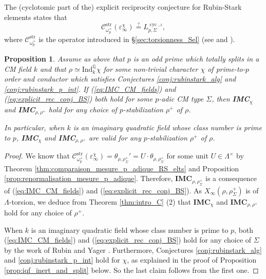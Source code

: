 \documentclass[12pt]{amsart}
\newcommand\bQ{\mathbb{Q}}
\newcommand\sC{\mathscr{C}}
\newcommand{\str}{\mathrm{str}}
\newcommand{\Ind}{\mathrm{Ind}}
\DeclareMathOperator{\cyc}{cyc}
\theoremstyle{defstyle}
\theoremstyle{thmstyle}
\newtheorem{proposition}[subsubsection]{Proposition}
\begin{document}
The (cyclotomic part of the) explicit reciprocity conjecture for Rubin-Stark elements states that 
\begin{equation}\label{eq:explicit_rec_conj_BS}
\sC_{\omega_p^+}^\str(\varepsilon_\infty^\chi)\overset{?}{=}L^{\cyc,\iota}_{p,\Sigma},
\end{equation}
where $\sC_{\omega_p^+}^\str$ is the operator introduced in \S\ref{sec:torsionness_Sel} (see \cite[Conjecture 2]{buyukbodukmainconjecture} and \cite[Conjecture 4.8 and (21)]{buyukboduksakamoto}).
\begin{proposition}\label{prop:IMC_Katz}
	Assume as above that $p$ is an odd prime which totally splits in a CM field $k$ and that $\rho\simeq \Ind_k^\bQ \chi$ for some non-trivial character $\chi$ of prime-to-$p$ order and conductor which satisfies Conjectures \ref{conj:rubinstark_alg} and \ref{conj:rubinstark_p_int}. If (\ref{eq:IMC_CM_fields}) and (\ref{eq:explicit_rec_conj_BS}) both hold for some $p$-adic CM type $\Sigma$, then \textbf{IMC}$_{\chi}$ and \textbf{IMC}$_{\rho,\rho^+}$ hold for any choice of $p$-stabilization $\rho^+$ of $\rho$. 
	
	In particular, when $k$ is an imaginary quadratic field whose class number is prime to $p$, \textbf{IMC}$_\chi$ and \textbf{IMC}$_{\rho,\rho^+}$ are valid for any $p$-stabilization $\rho^+$ of $\rho$. 
	\end{proposition}
\begin{proof}
 We know that $\sC_{\omega_p^+}^\str(\varepsilon_\infty^\chi)=\theta_{\rho,\rho_\Sigma^+}'=U\cdot \theta_{\rho,\rho_\Sigma^+}$ for some unit $U\in\Lambda^\times$ by Theorem \ref{thm:comparaison_mesure_p_adique_RS_elts} and Proposition \ref{prop:renormalisation_mesure_p_adique}. Therefore, \textbf{IMC}$_{\rho,\rho_\Sigma^+}$ is a consequence of (\ref{eq:IMC_CM_fields}) and (\ref{eq:explicit_rec_conj_BS}). As $X_\infty(\rho,\rho_\Sigma^+)$ is of $\Lambda$-torsion, we deduce from Theorem \ref{thm:intro_C} (2) that \textbf{IMC}$_{\chi}$ and \textbf{IMC}$_{\rho,\rho^+}$ hold for any choice of $\rho^+$. 
 
  When $k$ is an imaginary quadratic field whose class number is prime to $p$, both (\ref{eq:IMC_CM_fields}) and (\ref{eq:explicit_rec_conj_BS}) hold for any choice of $\Sigma$ by the work of Rubin \cite{rubin1991main} and Yager \cite{yager}. Furthermore, Conjectures \ref{conj:rubinstark_alg} and \ref{conj:rubinstark_p_int} hold for $\chi$, as explained in the proof of Proposition \ref{prop:iqf_inert_and_split} below. So the last claim follows from the first one.
\end{proof}
\end{document}
